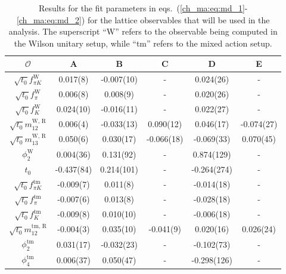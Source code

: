 \begin{table}
\label{ch_ma:tab:md}
\begin{center}
    \begin{tabular}{c c c c c c}
    $\mathcal{O}$ & A & B & C & D & E \\
    \hline
    $\sqrt{t_0}f_{\pi K}^{\textrm{W}}$ & 0.017(8) & -0.007(10) & - & 0.024(26) & - \\ 
    $\sqrt{t_0}f_{\pi}^{\textrm{W}}$ & 0.006(8) & 0.008(9) & - & 0.020(26) & - \\ 
    $\sqrt{t_0}f_{K}^{\textrm{W}}$ & 0.024(10) & -0.016(11) & - & 0.022(27) & - \\ 
    $\sqrt{t_0}m_{12}^{\textrm{W, R}}$ & 0.006(4) & -0.033(13) & 0.090(12) & 0.046(17) & -0.074(27) \\ 
    $\sqrt{t_0}m_{13}^{\textrm{W, R}}$ & 0.050(6) & 0.030(17) & -0.066(18) & -0.069(33) & 0.070(45) \\ 
    $\phi_2^{\textrm{W}}$ & 0.004(36) & 0.131(92) & - & 0.874(129) & - \\ 
    $t_0$ & -0.437(84) & 0.214(101) & - & -0.264(274) & - \\ 
    \hline
    $\sqrt{t_0}f_{\pi K}^{\textrm{tm}}$ & -0.009(7) & 0.011(8) & - & -0.014(18) & - \\ 
    $\sqrt{t_0}f_{\pi}^{\textrm{tm}}$ & -0.007(6) & 0.013(8) & - & -0.028(18) & - \\ 
    $\sqrt{t_0}f_{K}^{\textrm{tm}}$ & -0.009(8) & 0.010(10) & - & -0.006(18) & - \\ 
    $\sqrt{t_0}m_{12}^{\textrm{tm, R}}$ & -0.004(3) & 0.035(10) & -0.041(9) & 0.020(16) & 0.026(24) \\ 
    $\phi_2^{\textrm{tm}}$ & 0.031(17) & -0.032(23) & - & -0.102(73) & - \\ 
    $\phi_4^{\textrm{tm}}$ & 0.006(37) & 0.050(47) & - & -0.298(126) & - \\ 
    \end{tabular}
    \caption{Results for the fit parameters in eqs.~(\ref{ch_ma:eq:md_1}-\ref{ch_ma:eq:md_2}) for the lattice observables that will be used in the analysis. The superscript ``W'' refers to the observable being computed in the Wilson unitary setup, while ``tm'' refers to the mixed action setup.}
\end{center}
\end{table}

